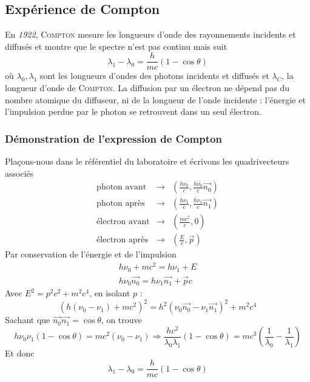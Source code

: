 \subsection{Expérience de Compton}%
En \textit{1922}, \textsc{Compton} mesure les longueurs d'onde des rayonnements incidents et diffusés
et montre que le spectre n'est pas continu mais suit
\begin{equation}
\lambda_1-\lambda_0=\frac{h}{mc}(1-\cos\theta)
\end{equation}
où $\lambda_0, \lambda_1$ sont les longueurs d'ondes des photons incidents et diffusés et $\lambda_C$, 
la longueur d'onde de \textsc{Compton}. La diffusion par un électron ne dépend pas du nombre 
atomique du diffuseur, ni de la longueur de l'onde incidente :  l'énergie et l'impulsion perdue par
le photon se retrouvent dans un seul électron.

\subsubsection{Démonstration de l'expression de Compton}
Plaçons-nous dans le référentiel du laboratoire et écrivons les quadrivecteurs associés
\begin{eqnarray}
\mbox{photon avant} &\rightarrow& \left(\frac{h\nu_0}{c},\frac{h\nu_0}{c}\overrightarrow{n_0}\right)\\
\mbox{photon apr\`es} &\rightarrow& \left(\frac{h\nu_1}{c},\frac{h\nu_1}{c}\overrightarrow{n_1}\right)\\
\mbox{\'electron avant} &\rightarrow& \left(\frac{mc^2}{c},0\right)\\
\mbox{\'electron apr\`es} &\rightarrow& \left(\frac{E}{c},\overrightarrow{p}\right)
\end{eqnarray}
Par conservation de l'énergie et de l'impulsion
\begin{eqnarray}
h\nu_0+mc^2=h\nu_1+E\\
h\nu_0\overrightarrow{n_0}=h\nu_1\overrightarrow{n_1}+\overrightarrow{p}c
\end{eqnarray}
Avec $E^2=p^2c^2+m^2c^4$, en isolant $p$ :
\begin{equation}
(h(\nu_0-\nu_1)+mc^2)^2=h^2(\nu_0\overrightarrow{n_0}-\nu_1\overrightarrow{n_1})^2+m^2c^4
\end{equation}
Sachant que $\overrightarrow{n_0}\overrightarrow{n_1}=\cos{\theta}$, on trouve
\begin{equation}
h\nu_0\nu_1(1-\cos\theta)=mc^2(\nu_0-\nu_1)\Rightarrow \frac{hc^2}{\lambda_0\lambda_1}(1-\cos\theta)=mc^3\left(\frac{1}{\lambda_0}-\frac{1}{\lambda_1}\right)
\end{equation}
Et donc
\begin{equation}
\lambda_1-\lambda_0=\frac{h}{mc}(1-\cos\theta)
\end{equation}

